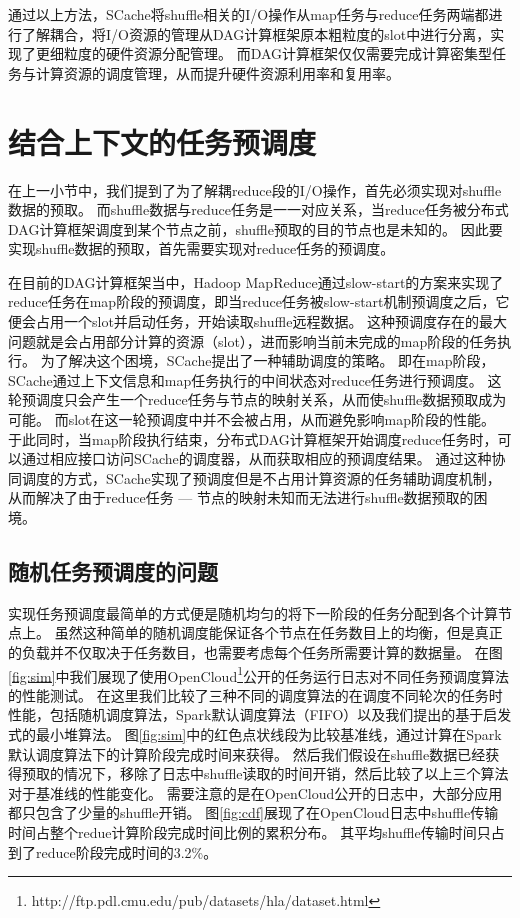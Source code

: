 通过以上方法，SCache将shuffle相关的I/O操作从map任务与reduce任务两端都进行了解耦合，将I/O资源的管理从DAG计算框架原本粗粒度的slot中进行分离，实现了更细粒度的硬件资源分配管理。
而DAG计算框架仅仅需要完成计算密集型任务与计算资源的调度管理，从而提升硬件资源利用率和复用率。

\section{结合上下文的任务预调度}

在上一小节中，我们提到了为了解耦reduce段的I/O操作，首先必须实现对shuffle数据的预取。
而shuffle数据与reduce任务是一一对应关系，当reduce任务被分布式DAG计算框架调度到某个节点之前，shuffle预取的目的节点也是未知的。
因此要实现shuffle数据的预取，首先需要实现对reduce任务的预调度。

在目前的DAG计算框架当中，Hadoop MapReduce通过slow-start\cite{hadoop}的方案来实现了reduce任务在map阶段的预调度，即当reduce任务被slow-start机制预调度之后，它便会占用一个slot并启动任务，开始读取shuffle远程数据。
这种预调度存在的最大问题就是会占用部分计算的资源（slot），进而影响当前未完成的map阶段的任务执行。
为了解决这个困境，SCache提出了一种辅助调度的策略。
即在map阶段，SCache通过上下文信息和map任务执行的中间状态对reduce任务进行预调度。
这轮预调度只会产生一个reduce任务与节点的映射关系，从而使shuffle数据预取成为可能。
而slot在这一轮预调度中并不会被占用，从而避免影响map阶段的性能。
于此同时，当map阶段执行结束，分布式DAG计算框架开始调度reduce任务时，可以通过相应接口访问SCache的调度器，从而获取相应的预调度结果。
通过这种协同调度的方式，SCache实现了预调度但是不占用计算资源的任务辅助调度机制，从而解决了由于reduce任务 --- 节点的映射未知而无法进行shuffle数据预取的困境。

\subsection{随机任务预调度的问题}

实现任务预调度最简单的方式便是随机均匀的将下一阶段的任务分配到各个计算节点上。
虽然这种简单的随机调度能保证各个节点在任务数目上的均衡，但是真正的负载并不仅取决于任务数目，也需要考虑每个任务所需要计算的数据量。
在图\ref{fig:sim}中我们展现了使用OpenCloud\footnote{http://ftp.pdl.cmu.edu/pub/datasets/hla/dataset.html}公开的任务运行日志对不同任务预调度算法的性能测试。
在这里我们比较了三种不同的调度算法的在调度不同轮次的任务时性能，包括随机调度算法，Spark默认调度算法（FIFO）以及我们提出的基于启发式的最小堆算法。
图\ref{fig:sim}中的红色点状线段为比较基准线，通过计算在Spark默认调度算法下的计算阶段完成时间来获得。
然后我们假设在shuffle数据已经获得预取的情况下，移除了日志中shuffle读取的时间开销，然后比较了以上三个算法对于基准线的性能变化。
需要注意的是在OpenCloud公开的日志中，大部分应用都只包含了少量的shuffle开销。
图\ref{fig:cdf}展现了在OpenCloud日志中shuffle传输时间占整个redue计算阶段完成时间比例的累积分布。
其平均shuffle传输时间只占到了reduce阶段完成时间的3.2\%。

